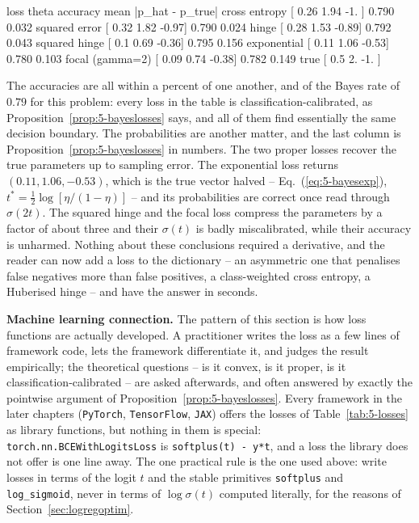 \begin{Python}{}
loss             theta                      accuracy   mean |p_hat - p_true|
cross entropy    [ 0.26  1.94 -1.  ]        0.790      0.032
squared error    [ 0.32  1.82 -0.97]        0.790      0.024
hinge            [ 0.28  1.53 -0.89]        0.792      0.043
squared hinge    [ 0.1   0.69 -0.36]        0.795      0.156
exponential      [ 0.11  1.06 -0.53]        0.780      0.103
focal (gamma=2)  [ 0.09  0.74 -0.38]        0.782      0.149
true             [ 0.5  2.  -1. ]
\end{Python}

The accuracies are all within a percent of one another, and of the Bayes rate
of $0.79$ for this problem: every loss in the table is classification-calibrated,
as Proposition~\ref{prop:5-bayeslosses} says, and all of them find essentially
the same decision boundary.  The probabilities are another matter, and the
last column is Proposition~\ref{prop:5-bayeslosses} in numbers.  The two
proper losses recover the true parameters up to sampling error.  The
exponential loss returns $(0.11,1.06,-0.53)$, which is the true vector halved
-- Eq.~(\ref{eq:5-bayesexp}), $t^{*}=\tfrac12\log[\eta/(1-\eta)]$ -- and its
probabilities are correct once read through $\sigma(2t)$.  The squared hinge
and the focal loss compress the parameters by a factor of about three and
their $\sigma(t)$ is badly miscalibrated, while their accuracy is unharmed.
Nothing about these conclusions required a derivative, and the reader can now
add a loss to the dictionary -- an asymmetric one that penalises false
negatives more than false positives, a class-weighted cross entropy, a
Huberised hinge -- and have the answer in seconds.

\begin{notebox}
\textbf{Machine learning connection.}  The pattern of this section is how
loss functions are actually developed.  A practitioner writes the loss as a
few lines of framework code, lets the framework differentiate it, and judges
the result empirically; the theoretical questions -- is it convex, is it
proper, is it classification-calibrated -- are asked afterwards, and often
answered by exactly the pointwise argument of
Proposition~\ref{prop:5-bayeslosses}.  Every framework in the later chapters
(\texttt{PyTorch}, \texttt{TensorFlow}, \texttt{JAX}) offers the losses of
Table~\ref{tab:5-losses} as library functions, but nothing in them is
special: \texttt{torch.nn.BCEWithLogitsLoss} is \texttt{softplus(t) - y*t},
and a loss the library does not offer is one line away.  The one practical
rule is the one used above: write losses in terms of the logit $t$ and the
stable primitives \texttt{softplus} and \texttt{log\_sigmoid}, never in terms
of $\log\sigma(t)$ computed literally, for the reasons of
Section~\ref{sec:logregoptim}.
\end{notebox}

